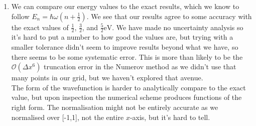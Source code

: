 \documentclass[11pt]{article}
\begin{document}
\begin{enumerate}
\begin{enumerate}
        \item We can compare our energy values to the exact results, which we know to follow $E_n=\hbar\omega\left(n+\frac 12\right)$. We see that our results agree to some accuracy with the exact values of $\frac 12$, $\frac 32$, and $\frac 52 \si{\electronvolt}$. We have made no uncertainty analysis so it's hard to put a number to how good the values are, but trying with a smaller tolerance didn't seem to improve results beyond what we have, so there seems to be some systematic error. This is more than likely to be the $\mathcal{O}(\Delta x^6)$ truncation error in the Numerov method as we didn't use that many points in our grid, but we haven't explored that avenue.\\
        The form of the wavefunction is harder to analytically compare to the exact value, but upon inspection the numerical scheme produces functions of the right form. The normalisation might not be entirely accurate as we normalised over [-1,1], not the entire $x$-axis, but it's hard to tell.
        
    \end{enumerate}

\end{enumerate}
\end{document}
